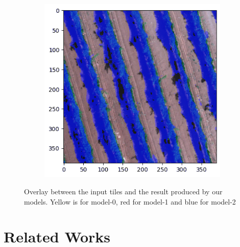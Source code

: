 \documentclass[comsoc,final]{IEEEtran}
\begin{document}
\begin{figure}
\begin{subfigure}[b]{0.45\columnwidth}
     \end{subfigure}%
%       
      \begin{subfigure}[b]{0.45\columnwidth}
         \centering \includegraphics[width=\columnwidth]{VITE2INF}
     \end{subfigure}%
     \caption{Overlay between the input tiles and the result produced by our models. 
     Yellow is for model-0, red for model-1 and blue for model-2}\label{fig:unet_models}
\end{figure}

\section{Related Works}\label{sec:related}
\end{document}
